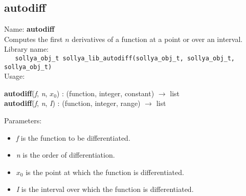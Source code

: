 \subsection{autodiff}
\label{labautodiff}
\noindent Name: \textbf{autodiff}\\
\phantom{aaa}Computes the first $n$ derivatives of a function at a point or over an interval.\\[0.2cm]
\noindent Library name:\\
\verb|   sollya_obj_t sollya_lib_autodiff(sollya_obj_t, sollya_obj_t, sollya_obj_t)|\\[0.2cm]
\noindent Usage: 
\begin{center}
\textbf{autodiff}(\emph{f}, \emph{n}, \emph{$x_0$}) : (\textsf{function}, \textsf{integer}, \textsf{constant}) $\rightarrow$ \textsf{list}\\
\textbf{autodiff}(\emph{f}, \emph{n}, \emph{I}) : (\textsf{function}, \textsf{integer}, \textsf{range}) $\rightarrow$ \textsf{list}\\
\end{center}
Parameters: 
\begin{itemize}
\item \emph{f} is the function to be differentiated.
\item \emph{n} is the order of differentiation.
\item \emph{$x_0$} is the point at which the function is differentiated.
\item \emph{I} is the interval over which the function is differentiated.
\end{itemize}

